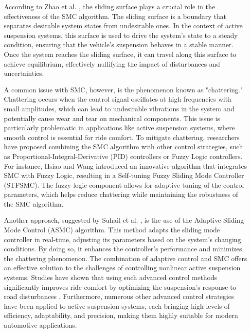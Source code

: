According to Zhao et al. \cite{zhao2023sliding}, the sliding surface plays a crucial role in the effectiveness of the SMC algorithm. The sliding surface is a boundary that separates desirable system states from undesirable ones. In the context of active suspension systems, this surface is used to drive the system’s state to a steady condition, ensuring that the vehicle’s suspension behaves in a stable manner. Once the system reaches the sliding surface, it can travel along this surface to achieve equilibrium, effectively nullifying the impact of disturbances and uncertainties.

A common issue with SMC, however, is the phenomenon known as "chattering." Chattering occurs when the control signal oscillates at high frequencies with small amplitudes, which can lead to undesirable vibrations in the system and potentially cause wear and tear on mechanical components. This issue is particularly problematic in applications like active suspension systems, where smooth control is essential for ride comfort. To mitigate chattering, researchers have proposed combining the SMC algorithm with other control strategies, such as Proportional-Integral-Derivative (PID) controllers or Fuzzy Logic controllers. For instance, Hsiao and Wang \cite{hsiao2022evaluation} introduced an innovative algorithm that integrates SMC with Fuzzy Logic, resulting in a Self-tuning Fuzzy Sliding Mode Controller (STFSMC). The fuzzy logic component allows for adaptive tuning of the control parameters, which helps reduce chattering while maintaining the robustness of the SMC algorithm.

Another approach, suggested by Suhail et al. \cite{suhail2022adaptive}, is the use of the Adaptive Sliding Mode Control (ASMC) algorithm. This method adapts the sliding mode controller in real-time, adjusting its parameters based on the system’s changing conditions. By doing so, it enhances the controller's performance and minimizes the chattering phenomenon. The combination of adaptive control and SMC offers an effective solution to the challenges of controlling nonlinear active suspension systems. Studies have shown that using such advanced control methods significantly improves ride comfort by optimizing the suspension's response to road disturbances \cite{wang2018nonlinear}. Furthermore, numerous other advanced control strategies have been applied to active suspension systems, each bringing high levels of efficiency, adaptability, and precision, making them highly suitable for modern automotive applications.
	
